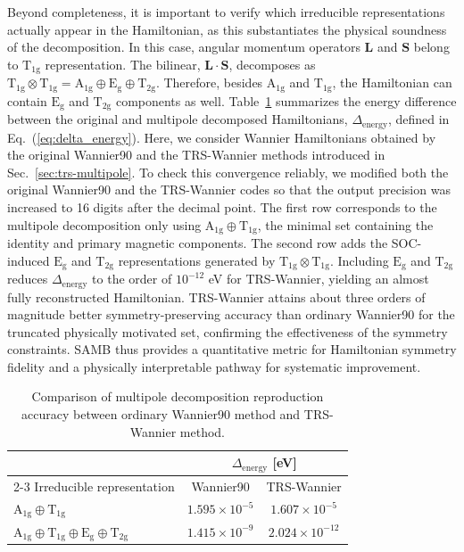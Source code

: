 \documentclass[preprint,12pt]{elsarticle}
\begin{document}
Beyond completeness, it is important to verify which irreducible
representations actually appear in the Hamiltonian, as this
substantiates the physical soundness of the decomposition.
In this case, angular momentum operators $\bm{L}$ and $\bm{S}$
belong to $\mathrm{T_{1g}}$ representation.
The bilinear, $\bm{L} \cdot \bm{S}$, decomposes as
$\mathrm{T_{1g}}\otimes\mathrm{T_{1g}}
=\mathrm{A_{1g}}\oplus\mathrm{E_g}\oplus\mathrm{T_{2g}}$.
Therefore, besides $\mathrm{A_{1g}}$ and $\mathrm{T_{1g}}$,
the Hamiltonian can contain
$\mathrm{E_g}$ and $\mathrm{T_{2g}}$ components as well.
Table~\ref{tab:delta_energy} summarizes the energy difference between
the original and multipole decomposed Hamiltonians,
$\Delta_{\mathrm{energy}}$, defined in Eq.~(\ref{eq:delta_energy}).
Here, we consider Wannier Hamiltonians obtained by the original Wannier90
and the TRS-Wannier methods introduced in Sec.\ \ref{sec:trs-multipole}.
To check this convergence reliably, we modified both the original
Wannier90 and the TRS-Wannier codes so that the output precision was
increased to 16 digits after the decimal point.
The first row corresponds to the multipole decomposition only using
$\mathrm{A_{1g}} \oplus \mathrm{T_{1g}}$, the
minimal set containing the identity and primary magnetic components.
The second row adds the SOC-induced $\mathrm{E_g}$ and
$\mathrm{T_{2g}}$ representations generated by $\mathrm{T_{1g}} \otimes
\mathrm{T_{1g}}$.
Including $\mathrm{E_g}$ and $\mathrm{T_{2g}}$ reduces
$\Delta_{\mathrm{energy}}$ to the order of $10^{-12}$ eV for TRS-Wannier,
yielding an almost fully reconstructed Hamiltonian.
TRS-Wannier attains about three orders of magnitude better
symmetry-preserving accuracy than ordinary Wannier90 for the
truncated physically motivated set,
confirming the effectiveness of the symmetry constraints.
SAMB thus provides a quantitative metric for Hamiltonian symmetry
fidelity and a physically interpretable pathway for systematic improvement.

\begin{table}[H]
  \centering
  \caption{Comparison of multipole decomposition reproduction
  accuracy between ordinary Wannier90 method and TRS-Wannier method.}
  \label{tab:delta_energy}
  \begin{tabular}{lcc}
    \toprule
    & \multicolumn{2}{c}{$\Delta_{\mathrm{energy}}$ [eV]}
    \\
    \cmidrule(lr){2-3}
    Irreducible representation
    & Wannier90                                           &
    TRS-Wannier             \\
    \midrule
    $\mathrm{A_{1g}} \oplus \mathrm{T_{1g}}$
    & $1.595 \times 10^{-5}$                              & $1.607
    \times 10^{-5}$  \\
    $\mathrm{A_{1g}} \oplus \mathrm{T_{1g}} \oplus \mathrm{E_g}
    \oplus \mathrm{T_{2g}}$ & $1.415 \times 10^{-9}$
    & $2.024 \times 10^{-12}$ \\
    \bottomrule
  \end{tabular}
\end{table}
\end{document}
